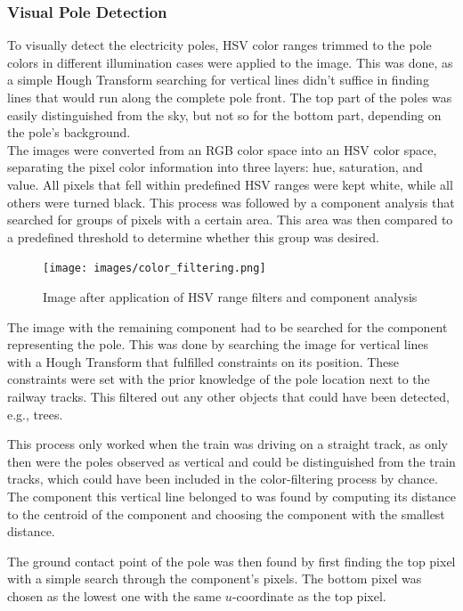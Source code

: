 \subsubsection{Visual Pole Detection}
To visually detect the electricity poles, HSV color ranges trimmed to the pole colors in different illumination cases were applied to the image. This was done, as a simple Hough Transform searching for vertical lines didn't suffice in finding lines that would run along the complete pole front. The top part of the poles was easily distinguished from the sky, but not so for the bottom part, depending on the pole's background. \\

The images were converted from an RGB color space into an HSV color space, separating the pixel color information into three layers: hue, saturation, and value. All pixels that fell within predefined HSV ranges were kept white, while all others were turned black. This process was followed by a component analysis that searched for groups of pixels with a certain area. This area was then compared to a predefined threshold to determine whether this group was desired. 

\begin{figure}[h]
   \centering
   \texttt{[image: images/color\_filtering.png]}
   \caption{Image after application of HSV range filters and component analysis}
   \label{pics:component}
\end{figure}

The image with the remaining component had to be searched for the component representing the pole. This was done by searching the image for vertical lines with a Hough Transform that fulfilled constraints on its position. These constraints were set with the prior knowledge of the pole location next to the railway tracks. This filtered out any other objects that could have been detected, e.g., trees. 

This process only worked when the train was driving on a straight track, as only then were the poles observed as vertical and could be distinguished from the train tracks, which could have been included in the color-filtering process by chance. The component this vertical line belonged to was found by computing its distance to the centroid of the component and choosing the component with the smallest distance.

The ground contact point of the pole was then found by first finding the top pixel with a simple search through the component's pixels. The bottom pixel was chosen as the lowest one with the same $u$-coordinate as the top pixel. 

